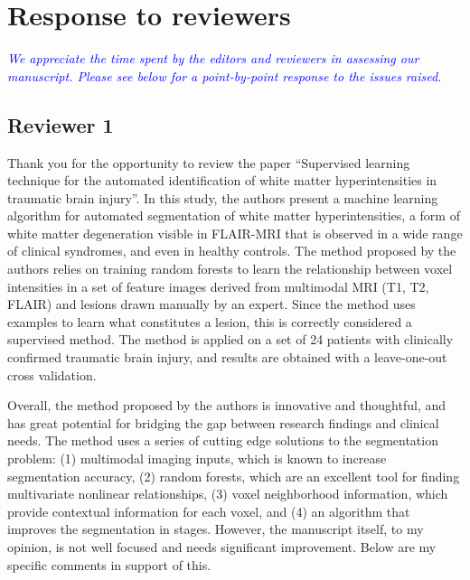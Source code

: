 \documentclass[12pt,]{article}
\title{}
\author{}
\date{}
\begin{document}
\maketitle

\section{Response to reviewers}\label{response-to-reviewers}

\emph{\textcolor{blue}{We appreciate the time spent by the editors and reviewers in
assessing our manuscript.  Please see below for a point-by-point response to the
issues raised.}}

\subsection{Reviewer 1}\label{reviewer-1}

Thank you for the opportunity to review the paper ``Supervised learning
technique for the automated identification of white matter
hyperintensities in traumatic brain injury''. In this study, the authors
present a machine learning algorithm for automated segmentation of white
matter hyperintensities, a form of white matter degeneration visible in
FLAIR-MRI that is observed in a wide range of clinical syndromes, and
even in healthy controls. The method proposed by the authors relies on
training random forests to learn the relationship between voxel
intensities in a set of feature images derived from multimodal MRI (T1,
T2, FLAIR) and lesions drawn manually by an expert. Since the method
uses examples to learn what constitutes a lesion, this is correctly
considered a supervised method. The method is applied on a set of 24
patients with clinically confirmed traumatic brain injury, and results
are obtained with a leave-one-out cross validation.

Overall, the method proposed by the authors is innovative and
thoughtful, and has great potential for bridging the gap between
research findings and clinical needs. The method uses a series of
cutting edge solutions to the segmentation problem: (1) multimodal
imaging inputs, which is known to increase segmentation accuracy, (2)
random forests, which are an excellent tool for finding multivariate
nonlinear relationships, (3) voxel neighborhood information, which
provide contextual information for each voxel, and (4) an algorithm that
improves the segmentation in stages. However, the manuscript itself, to
my opinion, is not well focused and needs significant improvement. Below
are my specific comments in support of this.
\end{document}
